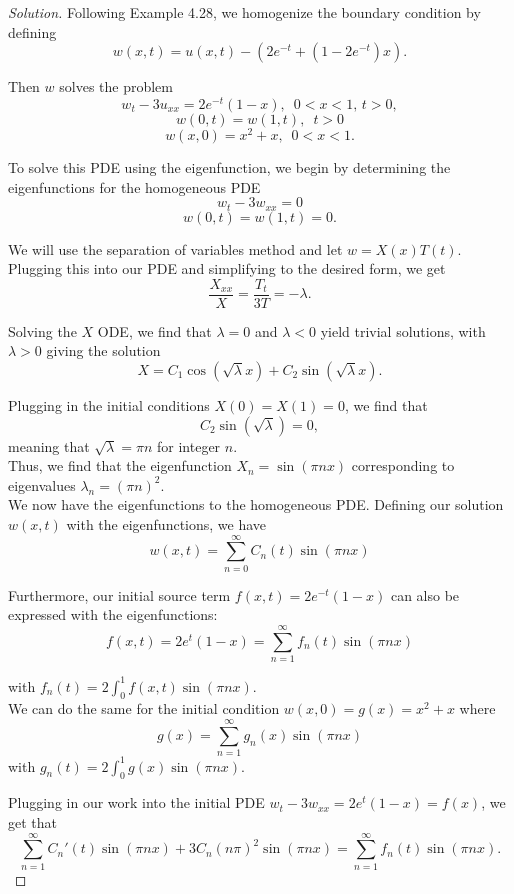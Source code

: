 \documentclass[11pt]{article}
\newenvironment{solution}
  {\renewcommand\qedsymbol{$\blacksquare$}\begin{proof}[Solution]}
  {\end{proof}}
\begin{document}
\begin{solution}
Following Example 4.28, we homogenize the boundary condition by defining \[ w(x, t) = u(x, t) - \left( 2e^{-t} + \left(1-2e^{-t}\right)x\right).\]

Then $w$ solves the problem 
\[ w_t - 3u_{xx} = 2e^{-t}(1-x), \, \, \, 0 < x < 1, \, t > 0,\]
\[ w(0, t) = w(1, t), \, \, \, t > 0\]
\[ w(x, 0) = x^2+x, \, \, \, 0 < x < 1.\]

To solve this PDE using the eigenfunction, we begin by determining the eigenfunctions for the homogeneous PDE
\[ w_t - 3w_{xx} = 0\]
\[ w(0, t) = w(1, t) = 0.\]

We will use the separation of variables method and let $w = X(x)T(t)$. Plugging this into our PDE and simplifying to the desired form, we get
\[ \frac{X_{xx}}{X} = \frac{T_t}{3T} = -\lambda.\]

Solving the $X$ ODE, we find that $\lambda = 0$ and $\lambda < 0$ yield trivial solutions, with $\lambda > 0$ giving the solution 
\[ X = C_1\cos(\sqrt{\lambda} x) + C_2 \sin(\sqrt{\lambda}x).\]

Plugging in the initial conditions $X(0) = X(1) = 0$, we find that 
\[C_2 \sin(\sqrt{\lambda}) = 0,\] meaning that $\sqrt{\lambda} = \pi n$ for integer $n$. \\

Thus, we find that the eigenfunction $X_n = \sin(\pi n x)$ corresponding to eigenvalues $\lambda_n = (\pi n)^2.$ \\

We now have the eigenfunctions to the homogeneous PDE. Defining our solution $w(x, t)$ with the eigenfunctions, we have \[ w(x, t) = \sum\limits_{n=0}^{\infty} C_n(t) \sin(\pi n x)\]

Furthermore, our initial source term $f(x, t) = 2e^{-t}(1-x)$ can also be expressed with the eigenfunctions:
\[ f(x, t) =2e^t(1-x) =\sum\limits_{n=1}^\infty f_n(t)\sin(\pi n x)\]

with $f_n(t) = 2\int_0^1 f(x, t) \sin(\pi n x).$ \\

We can do the same for the initial condition $w(x, 0) = g(x) = x^2 + x$ where 
\[ g(x) = \sum\limits_{n=1}^\infty g_n(x)\sin(\pi n x)\]
with $g_n(t) = 2\int_0^1 g(x) \sin(\pi n x).$

Plugging in our work into the initial PDE $w_t - 3w_{xx} = 2e^{t}(1-x) = f(x)$, we get that
\[ \sum\limits_{n=1}^{\infty} C_n'(t) \sin(\pi n x) + 3C_n(n\pi)^2 \sin(\pi n x) = \sum\limits_{n=1}^{\infty} f_n(t)\sin(\pi n x).\]


\end{solution}
\end{document}
